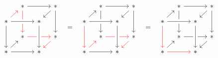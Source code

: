 \documentclass[a4paper,10pt]{article}
\begin{document}
\[\begin{array}{cccccccc}
\begin{tikzcd}[row sep = 10, column sep = 10]
        {}
      & *
        \arrow[rr]
        \arrow[dd, red]
      & {}
      & *
        \arrow[dl]
        \arrow[dd]
      \\
        *
        \arrow[ur, red]
        \arrow[rr, crossing over]
        \arrow[dd]
      & {}
      & *
      & {}
      \\
        {}
      & *
        \arrow[rr, red]
      & {}
      & *
        \arrow[dl, red]
      \\
        *
        \arrow[ur]
        \arrow[rr]
      & {}
      & *
        \arrow[from=uu, crossing over]
      & {}
    \end{tikzcd}
    & = &
    \begin{tikzcd}[row sep = 10, column sep = 10]
        {}
      & *
        \arrow[rr]
        \arrow[dd]
      & {}
      & *
        \arrow[dl]
        \arrow[dd]
      \\
        *
        \arrow[ur]
        \arrow[rr, crossing over]
        \arrow[dd, red]
      & {}
      & *
      & {}
      \\
        {}
      & *
        \arrow[rr, red]
      & {}
      & *
        \arrow[dl, red]
      \\
        *
        \arrow[ur, red]
        \arrow[rr]
      & {}
      & *
        \arrow[from=uu, crossing over]
      & {}
    \end{tikzcd}
    & = &
    \begin{tikzcd}[row sep = 10, column sep = 10]
        {}
      & *
        \arrow[rr]
        \arrow[dd]
      & {}
      & *
        \arrow[dl]
        \arrow[dd]
      \\
        *
        \arrow[ur]
        \arrow[rr, crossing over]
        \arrow[dd, red]
      & {}
      & *
      & {}
      \\
        {}
      & *
        \arrow[rr]
      & {}
      & *
        \arrow[dl]
      \\
        *
        \arrow[ur]
        \arrow[rr, red]
      & {}
      & *
        \arrow[from=uu, crossing over]
      & {}
    \end{tikzcd}
  \end{array}
\]
\end{document}
